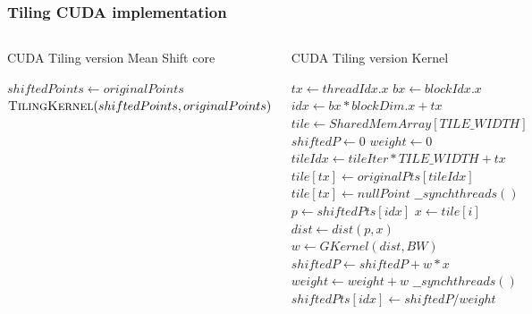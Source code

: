 \documentclass[xcolor=table]{beamer}
\begin{document}

\begin{frame}
\frametitle{Tiling CUDA implementation}
\begin{columns}[c]

\tiny{
\begin{algorithm}[H]
\tiny
\caption{\small{CUDA Tiling version Mean Shift core}}
\label{TilingCUDAMeanShiftAlg}
\begin{algorithmic}
	\State$shiftedPoints \gets originalPoints$
    		\State $\Call{TilingKernel}{shiftedPoints, originalPoints}$
    \EndWhile
\EndFunction
\end{algorithmic}
\end{algorithm}
}

\vspace{-0.45cm}
\begin{algorithm}[H]
\tiny
\caption{CUDA Tiling version Kernel}
\label{TilingCUDAKernelAlg}
\begin{algorithmic}
	\State $tx \gets threadIdx.x$
	\State $bx \gets blockIdx.x$
	\State $idx \gets bx * blockDim.x + tx$
	\State $tile \gets SharedMemArray[TILE\_WIDTH]$
	\State $shiftedP \gets 0$
	\State $weight \gets 0$
		\State$tileIdx \gets tileIter * TILE\_WIDTH + tx$
			\State$tile[tx] \gets originalPts[tileIdx]$
		\Else
			\State$tile[tx] \gets nullPoint$
		\EndIf
		\State $\_\_synchthreads()$
			\State $p \gets shiftedPts[idx]$
    				\State $x \gets tile[i]$
    					\State $dist \gets dist(p, x)$
    					\State $w \gets GKernel(dist, BW)$
    					\State $shiftedP\gets shiftedP + w*x$
    					\State $weight \gets weight + w$
    				\EndIf
    			\EndFor
    		\EndIf
    		\State $\_\_synchthreads()$
	\EndFor
    		\State $shiftedPts[idx] \gets shiftedP/weight$
    	\EndIf
    
\EndFunction
\end{algorithmic}
\end{algorithm}
\end{columns}
\end{frame}
\end{document}
